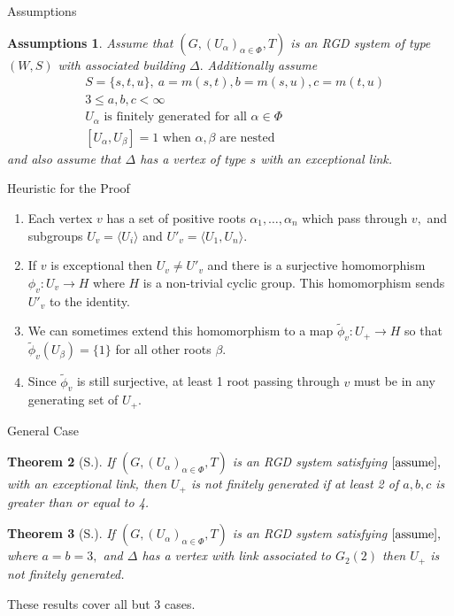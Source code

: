 \documentclass[xcolor=dvipsnames]{beamer}
\newtheorem{Theo}{Theorem}
\newtheorem{assume}[Theo]{Assumptions}
\theoremstyle{definition}
\begin{document}
\begin{frame}{Assumptions}
	\begin{assume}
		Assume that $(G,(U_\alpha)_{\alpha\in \Phi},T)$ is an RGD system of type $(W,S)$ with associated building $\Delta.$ Additionally assume
		\begin{equation}
	\label{assume}
	\tag{A} 
\begin{aligned}
	&S=\{s,t,u\},\: a=m(s,t),b=m(s,u),c=m(t,u)\\
	&3\le a,b,c<\infty\\
	&U_\alpha \text{ is finitely generated for all }\alpha\in \Phi\\
	&[U_\alpha,U_\beta]=1\text{ when }\alpha,\beta \text{ are nested}
\end{aligned}
\end{equation}
and also assume that $\Delta$ has a vertex of type $s$ with an exceptional link.
	\end{assume}
\end{frame}

\begin{frame}{Heuristic for the Proof}
\begin{enumerate}
	\item Each vertex $v$ has a set of positive roots $\alpha_1,\dots,\alpha_n$ which pass through $v,$ and subgroups $U_v=\langle U_i\rangle$ and $U'_v=\langle U_1,U_n\rangle.$
		\pause 
	\item If $v$ is exceptional then $U_v\neq U'_v$ and there is a surjective homomorphism $\phi_v:U_v\to H$ where $H$ is a non-trivial cyclic group. This homomorphism sends $U'_v$ to the identity.
		\pause
	\item We can sometimes extend this homomorphism to a map $\tilde{\phi}_v:U_+\to H$ so that $\tilde{\phi}_v(U_\beta)=\{1\}$ for all other roots $\beta.$
		\pause
	\item Since $\tilde{\phi}_v$ is still surjective, at least 1 root passing through $v$ must be in any generating set of $U_+.$
\end{enumerate}
\end{frame}

\begin{frame}{General Case}
	\begin{Theo}[S.]
		If $(G,(U_\alpha)_{\alpha\in \Phi},T)$ is an RGD system satisfying $\eqref{assume},$ with an exceptional link, then $U_+$ is not finitely generated if at least 2 of $a,b,c$ is greater than or equal to 4.	
\end{Theo}
\begin{Theo}[S.]
	If $(G,(U_\alpha)_{\alpha\in \Phi},T)$ is an RGD system satisfying $\eqref{assume},$ where $a=b=3,$ and $\Delta$ has a vertex with link associated to $G_2(2)$ then $U_+$ is not finitely generated.
\end{Theo}
These results cover all but 3 cases.
\end{frame}
\end{document}

